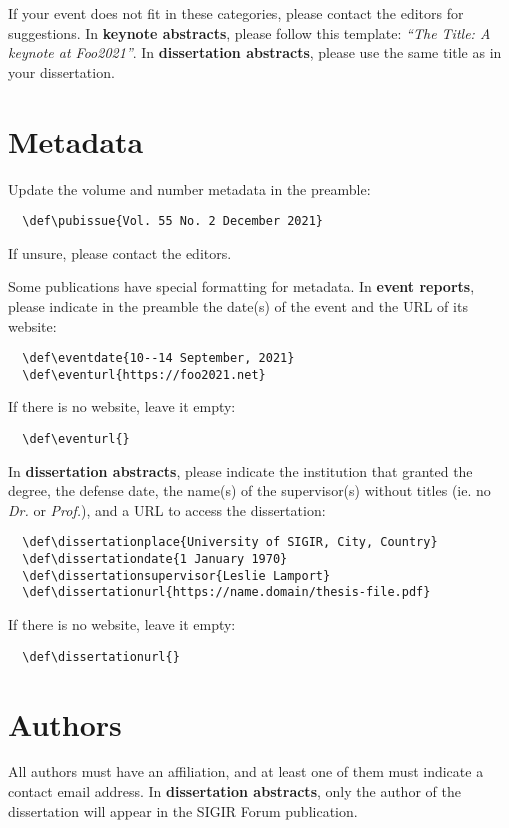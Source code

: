 \documentclass[news]{sigirforum}
\def\pubissue{September 2021}
\begin{document}
If your event does not fit in these categories, please contact the editors for suggestions. In \textbf{keynote abstracts}, please follow this template: \textsl{``The Title: A keynote at Foo2021''}. In \textbf{dissertation abstracts}, please use the same title as in your dissertation.

\section{Metadata}

Update the volume and number metadata in the preamble:
\begin{verbatim}
  \def\pubissue{Vol. 55 No. 2 December 2021}
\end{verbatim}
If unsure, please contact the editors.

Some publications have special formatting for metadata. In \textbf{event reports}, please indicate in the preamble the date(s) of the event and the URL of its website:
\begin{verbatim}
  \def\eventdate{10--14 September, 2021}
  \def\eventurl{https://foo2021.net}
\end{verbatim}
If there is no website, leave it empty:
\begin{verbatim}
  \def\eventurl{}
\end{verbatim}

In \textbf{dissertation abstracts}, please indicate the institution that granted the degree, the defense date, the name(s) of the supervisor(s) without titles (ie. no \textsl{Dr.} or \textsl{Prof.}), and a URL to access the dissertation:
\begin{verbatim}
  \def\dissertationplace{University of SIGIR, City, Country}
  \def\dissertationdate{1 January 1970}
  \def\dissertationsupervisor{Leslie Lamport}
  \def\dissertationurl{https://name.domain/thesis-file.pdf}
\end{verbatim}
If there is no website, leave it empty:
\begin{verbatim}
  \def\dissertationurl{}
\end{verbatim}

\section{Authors}

All authors must have an affiliation, and at least one of them must indicate a contact email address. In \textbf{dissertation abstracts}, only the author of the dissertation will appear in the SIGIR Forum publication.
\end{document}
